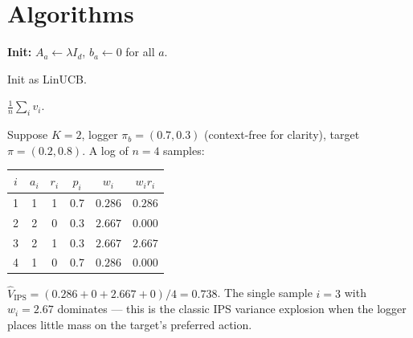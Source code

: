 \documentclass[11pt,oneside]{scrbook}
\begin{document}
\chapter{Algorithms}

\begin{algorithm}[H]
\caption{LinUCB (disjoint arms)}\label{alg:linucb}
\DontPrintSemicolon
{}
\textbf{Init:} $A_a \leftarrow \lambda I_d$, $b_a \leftarrow 0$ for all $a$.\;
\end{algorithm}

\begin{algorithm}[H]
\caption{LinTS (Gaussian posterior sampling)}\label{alg:lints}
\DontPrintSemicolon
{}
Init as LinUCB.\;
\end{algorithm}

\begin{algorithm}[H]
\caption{Doubly Robust OPE}\label{alg:dr}
\DontPrintSemicolon
{}
\Return $\frac{1}{n}\sum_i v_i$.\;
\end{algorithm}

\begin{example}
Suppose $K=2$, logger $\pi_b = (0.7, 0.3)$ (context-free for clarity), target
$\pi = (0.2, 0.8)$. A log of $n=4$ samples:
\begin{center}
\begin{tabular}{cccccc}
\toprule
$i$ & $a_i$ & $r_i$ & $p_i$ & $w_i$ & $w_i r_i$ \\
\midrule
1 & 1 & 1 & 0.7 & $0.286$ & $0.286$ \\
2 & 2 & 0 & 0.3 & $2.667$ & $0.000$ \\
3 & 2 & 1 & 0.3 & $2.667$ & $2.667$ \\
4 & 1 & 0 & 0.7 & $0.286$ & $0.000$ \\
\bottomrule
\end{tabular}
\end{center}
$\hat V_{\mathrm{IPS}} = (0.286 + 0 + 2.667 + 0)/4 = 0.738$. The single sample
$i=3$ with $w_i = 2.67$ dominates --- this is the classic IPS variance
explosion when the logger places little mass on the target's preferred
action.
\end{example}
\end{document}
